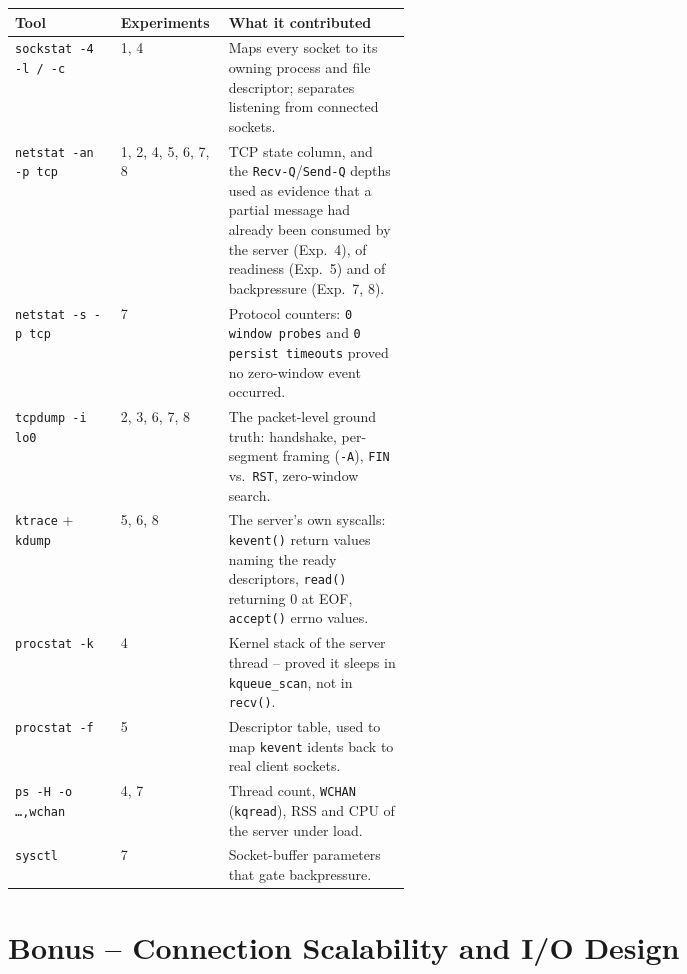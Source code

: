 \documentclass[11pt,a4paper]{article}
\begin{document}
\begin{center}
\small
\begin{tabular}{@{}llp{0.46\linewidth}@{}}
\toprule
\textbf{Tool} & \textbf{Experiments} & \textbf{What it contributed} \\
\midrule
\texttt{sockstat -4 -l / -c} & 1, 4 &
  Maps every socket to its owning process and file descriptor; separates listening from
  connected sockets. \\
\texttt{netstat -an -p tcp} & 1, 2, 4, 5, 6, 7, 8 &
  TCP state column, and the \texttt{Recv-Q}/\texttt{Send-Q} depths used as evidence that
  a partial message had already been consumed by the server (Exp.~4), of readiness
  (Exp.~5) and of backpressure (Exp.~7, 8). \\
\texttt{netstat -s -p tcp} & 7 &
  Protocol counters: \texttt{0 window probes} and \texttt{0 persist timeouts} proved no
  zero-window event occurred. \\
\texttt{tcpdump -i lo0} & 2, 3, 6, 7, 8 &
  The packet-level ground truth: handshake, per-segment framing (\texttt{-A}),
  \texttt{FIN} vs.\ \texttt{RST}, zero-window search. \\
\texttt{ktrace} + \texttt{kdump} & 5, 6, 8 &
  The server's own syscalls: \texttt{kevent()} return values naming the ready
  descriptors, \texttt{read()} returning 0 at EOF, \texttt{accept()} errno values. \\
\texttt{procstat -k} & 4 &
  Kernel stack of the server thread -- proved it sleeps in
  \texttt{kqueue\_scan}, not in \texttt{recv()}. \\
\texttt{procstat -f} & 5 &
  Descriptor table, used to map \texttt{kevent} idents back to real client sockets. \\
\texttt{ps -H -o \dots,wchan} & 4, 7 &
  Thread count, \texttt{WCHAN} (\texttt{kqread}), RSS and CPU of the server under load. \\
\texttt{sysctl} & 7 &
  Socket-buffer parameters that gate backpressure. \\
\bottomrule
\end{tabular}
\end{center}

\appendix
\section{Bonus -- Connection Scalability and I/O Design}
\label{sec:bonus}
\end{document}
